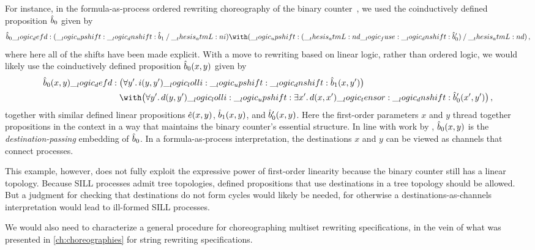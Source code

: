 
For instance, in the formula-as-process ordered rewriting choreography of the binary counter~, we used the coinductively defined proposition $\hat{b}_0$ given by 
\begin{equation*}
  \defp{b}_0 \defd (\up \dn \defp{b}_1 \pmir \atmL{i}) \with (\up (\atmL{d} \fuse \dn \defp{b}'_0) \pmir \atmL{d})
  \,,
\end{equation*}
where here all of the shifts have been made explicit.
With a move to rewriting based on linear logic, rather than ordered logic, we would likely use the coinductively defined proposition $\hat{b}_0(x, y)$ given by
\begin{equation*}
  \defp{b}_0(x, y) \defd
    \begin{lgathered}[t]
      \bigl(\forall y'.\, i(y, y') \lolli \up \dn \defp{b}_1(x, y')\bigr) \\
      {} \with \bigl(\forall y'.\, d(y, y') \lolli \up \exists x'.\, d(x, x') \tensor \dn \defp{b}'_0(x', y')\bigr)
    \,,
    \end{lgathered}
\end{equation*}
together with similar defined linear propositions $\hat{e}(x, y)$, $\hat{b}_1(x, y)$, and $\hat{b}'_0(x, y)$.
Here the first-order parameters $x$ and $y$ thread together propositions in the context in a way that maintains the binary counter's essential structure.
In line with work by \textcite{Simmons+Pfenning:HOSC11}, $\hat{b}_0(x, y)$ is the \emph{destination-passing} embedding of $\hat{b}_0$.
In a formula-as-process interpretation, the destinations $x$ and $y$ can be viewed as channels that connect processes.

This example, however, does not fully exploit the expressive power of first-order linearity because the binary counter still has a linear topology.
Because \ac{SILL} processes admit tree topologies, defined propositions that use destinations in a tree topology should be allowed.
But a judgment for checking that destinations do not form cycles would likely be needed, for otherwise a destinations-as-channels interpretation would lead to ill-formed \ac{SILL} processes.

We would also need to characterize a general procedure for choreographing multiset rewriting specifications, in the vein of what was presented in \cref{ch:choreographies} for string rewriting specifications.


